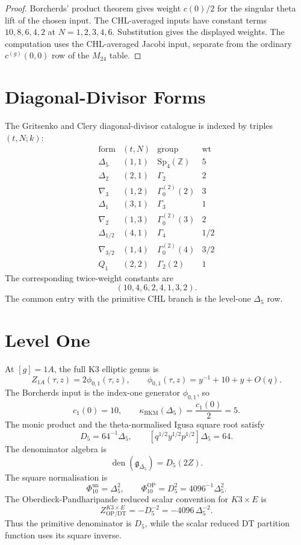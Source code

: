 \documentclass[11pt]{article}
\providecommand{\Z}{\mathbb{Z}}
\providecommand{\Sp}{\mathrm{Sp}}
\providecommand{\DT}{\mathrm{DT}}
\providecommand{\wt}{\operatorname{wt}}
\providecommand{\kBKM}{\kappa_{\mathrm{BKM}}}
\providecommand{\fg}{\mathfrak{g}}
\providecommand{\Dfive}{\Delta_5}
\providecommand{\Phiten}{\Phi_{10}}
\providecommand{\fone}{\phi_{0,1}}
\begin{document}
\begin{proof}
Borcherds' product theorem gives weight \(c(0)/2\) for the singular
theta lift of the chosen input.  The CHL-averaged inputs have
constant terms \(10,8,6,4,2\) at \(N=1,2,3,4,6\).  Substitution gives
the displayed weights.  The computation uses the CHL-averaged Jacobi
input, separate from the ordinary \(c^{(g)}(0,0)\) row of the
\(M_{24}\) table.
\end{proof}

\section{Diagonal-Divisor Forms}

The Gritsenko and Clery diagonal-divisor catalogue is indexed by
triples \((t,N;k)\):
\[
\begin{array}{c|c|c|c}
\text{form} & (t,N) & \text{group} & \wt\\
\hline
\Dfive & (1,1) & \Sp_4(\Z) & 5\\
\Delta_2 & (2,1) & \Gamma_2 & 2\\
\nabla_3 & (1,2) & \Gamma_0^{(2)}(2) & 3\\
\Delta_1 & (3,1) & \Gamma_3 & 1\\
\nabla_2 & (1,3) & \Gamma_0^{(2)}(3) & 2\\
\Delta_{1/2} & (4,1) & \Gamma_4 & 1/2\\
\nabla_{3/2} & (1,4) & \Gamma_0^{(2)}(4) & 3/2\\
Q_1 & (2,2) & \Gamma_2(2) & 1
\end{array}
\]
The corresponding twice-weight constants are
\[
  (10,4,6,2,4,1,3,2).
\]
The common entry with the primitive CHL branch is the level-one
\(\Dfive\) row.

\section{Level One}

At \([g]=1A\), the full K3 elliptic genus is
\[
  Z_{1A}(\tau,z)=2\fone(\tau,z),
  \qquad
  \fone(\tau,z)=y^{-1}+10+y+O(q).
\]
The Borcherds input is the index-one generator \(\fone\), so
\[
  c_1(0)=10,\qquad
  \kBKM(\Dfive)=\frac{c_1(0)}2=5.
\]
The monic product and the theta-normalised Igusa square root satisfy
\[
  D_5=64^{-1}\Dfive,\qquad
  [q^{1/2}y^{1/2}p^{1/2}]\Dfive=64.
\]
The denominator algebra is
\[
  \operatorname{den}(\fg_{\Dfive})=D_5(2Z).
\]
The square normalisation is
\[
  \Phiten^{\mathrm{un}}=\Dfive^2,\qquad
  \Phiten^{\mathrm{OP}}=D_5^2=4096^{-1}\Dfive^2.
\]
The Oberdieck-Pandharipande reduced scalar convention for
\(K3\times E\) is
\[
  Z_{\mathrm{OP}/\DT}^{K3\times E}=-D_5^{-2}
  =-4096\,\Dfive^{-2}.
\]
Thus the primitive denominator is \(D_5\), while the scalar reduced
DT partition function uses its square inverse.
\end{document}

